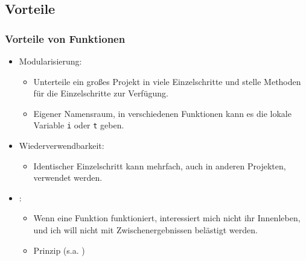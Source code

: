   \subsection{Vorteile}
  \begin{frame}
      \frametitle{Vorteile von Funktionen}
      \begin{itemize}
        \item Modularisierung:
        \begin{itemize}
          \item Unterteile ein großes Projekt in viele Einzelschritte und stelle Methoden für die Einzelschritte zur Verfügung.
          \item Eigener Namensraum, in verschiedenen Funktionen kann es die lokale Variable \texttt{i} oder \texttt{t} geben.
        \end{itemize}
        \item Wiederverwendbarkeit:
        \begin{itemize}
          \item Identischer Einzelschritt kann mehrfach, auch in anderen Projekten, verwendet werden.
        \end{itemize}
        \item {}:
        \begin{itemize}
          \item Wenn eine Funktion funktioniert, interessiert mich nicht ihr Innenleben, und ich will nicht mit Zwischenergebnissen belästigt werden.
          \item {} Prinzip (s.a. )
        \end{itemize}
      \end{itemize}
  \end{frame}

